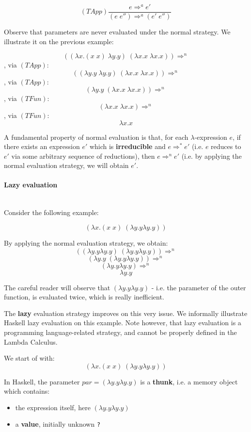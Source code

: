 $$ (TApp) \frac{e \Rightarrow^a e'}{(e\;e'')\Rightarrow^a (e'\;e'')}$$

Observe that parameters are never evaluated under the normal strategy. We illustrate it on the previous example:

$$ ((\lambda x.(x\;x)\;\lambda y.y)\;(\lambda x.x\;\lambda x.x)) \Rightarrow^n$$, via $(TApp)$:
$$ ((\lambda y.y\;\lambda y.y)\;(\lambda x.x\;\lambda x.x)) \Rightarrow^n$$, via $(TApp)$:
$$ (\lambda y.y\;(\lambda x.x\;\lambda x.x)) \Rightarrow^n$$, via $(TFun)$:
$$ (\lambda x.x\;\lambda x.x) \Rightarrow^n$$, via $(TFun)$:
$$ \lambda x.x $$

A fundamental property of normal evaluation is that, for each $\lambda$-expression $e$, if there exists an expression $e'$ which is \textbf{irreducible} and $e\Rightarrow^* e'$ (i.e. $e$ reduces to $e'$ via some arbitrary sequence of reductions), then $e\Rightarrow^n e'$ (i.e. by applying the normal evaluation strategy, we will obtain $e'$.

\paragraph{ Lazy evaluation }\hfill\\

Consider the following example:

$$ (\lambda x.(x\;x)\;(\lambda y.y \lambda y.y))$$

By applying the normal evaluation strategy, we obtain:
$$ ((\lambda y.y \lambda y.y)\;(\lambda y.y \lambda y.y)) \Rightarrow^n$$
$$ (\lambda y.y\;(\lambda y.y \lambda y.y)) \Rightarrow^n$$
$$ (\lambda y.y \lambda y.y) \Rightarrow^n$$
$$ \lambda y.y$$

The careful reader will observe that $(\lambda y.y \lambda y.y)$ - i.e. the parameter of the outer function, is evaluated twice, which is really inefficient.

The \textbf{lazy} evaluation strategy improves on this very issue. We informally illustrate Haskell lazy evaluation on this example. Note however, that lazy evaluation is a programming language-related strategy, and cannot be properly defined in the Lambda Calculus.

We start of with:
$$ (\lambda x.(x\;x)\;(\lambda y.y \lambda y.y))$$

In Haskell, the parameter $par = (\lambda y.y \lambda y.y)$ is a \textbf{thunk}, i.e. a memory object which contains:
\begin{itemize}
	\item  the expression itself, here $(\lambda y.y \lambda y.y)$
	\item  a \textbf{value}, initially unknown \texttt{?}
\end{itemize}

